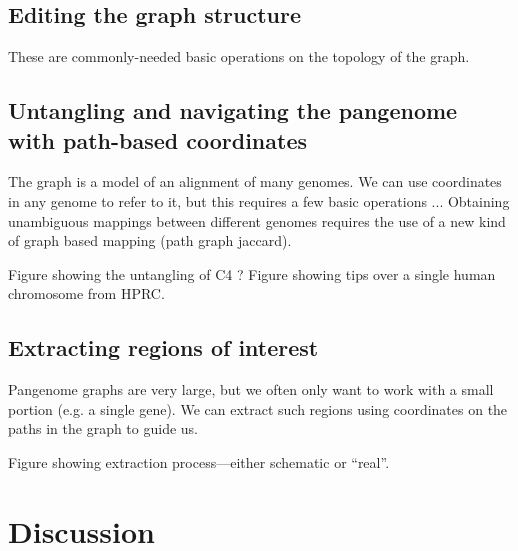 \documentclass{bioinfo}
\begin{document}

\subsection{Editing the graph structure}


These are commonly-needed basic operations on the topology of the graph.

\subsection{Untangling and navigating the pangenome with path-based coordinates}


The graph is a model of an alignment of many genomes.
We can use coordinates in any genome to refer to it, but this requires a few basic operations ...
Obtaining unambiguous mappings between different genomes requires the use of a new kind of graph based mapping (path graph jaccard).

Figure showing the untangling of C4 ?
Figure showing tips over a single human chromosome from HPRC.

\subsection{Extracting regions of interest}


Pangenome graphs are very large, but we often only want to work with a small portion (e.g. a single gene).
We can extract such regions using coordinates on the paths in the graph to guide us.

Figure showing extraction process---either schematic or ``real''.

\section{Discussion}

\end{document}

